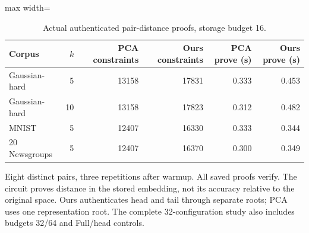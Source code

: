 \begin{table}[tp]
\caption{Actual authenticated pair-distance proofs, storage budget 16.}\label{tab:pair-proofs}
\centering\small
\begin{adjustbox}{max width=\textwidth}
\begin{tabular}{@{}lrrrrr@{}}
\toprule
Corpus & $k$ & PCA constraints & Ours constraints & PCA prove (s) & Ours prove (s) \\
\midrule
Gaussian-hard & 5 & 13158 & 17831 & 0.333 & 0.453 \\
Gaussian-hard & 10 & 13158 & 17823 & 0.312 & 0.482 \\
MNIST & 5 & 12407 & 16330 & 0.333 & 0.344 \\
20 Newsgroups & 5 & 12407 & 16370 & 0.300 & 0.349 \\
\bottomrule
\end{tabular}
\end{adjustbox}
\par\vspace{3pt}\begin{minipage}{0.98\textwidth}\footnotesize Eight distinct pairs, three repetitions after warmup. All saved proofs verify. The circuit proves distance in the stored embedding, not its accuracy relative to the original space. Ours authenticates head and tail through separate roots; PCA uses one representation root. The complete 32-configuration study also includes budgets 32/64 and Full/head controls.\end{minipage}
\end{table}
